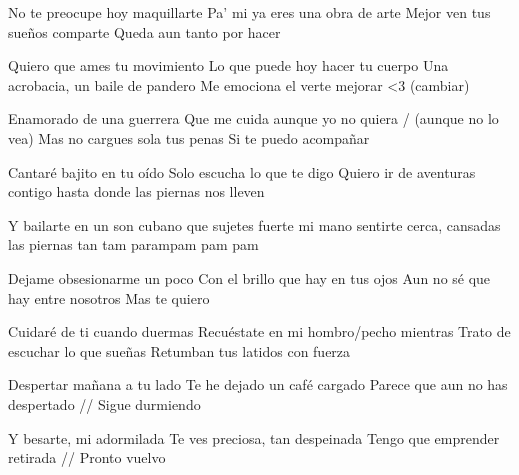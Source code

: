 
    No te preocupe hoy maquillarte
    Pa' mi ya eres una obra de arte
    Mejor ven tus sueños comparte
    Queda aun tanto por hacer
\endverse

\beginverse
    Quiero que ames tu movimiento
    Lo que puede hoy hacer tu cuerpo
    Una acrobacia, un baile de pandero
    Me emociona el verte mejorar <3 (cambiar)
\endverse

\beginverse
    Enamorado de una guerrera
    Que me cuida aunque yo no quiera / (aunque no lo vea)
    Mas no cargues sola tus penas
    Si te puedo acompañar
\endverse

\beginverse
    Cantaré bajito en tu oído
    Solo escucha lo que te digo
    Quiero ir de aventuras contigo
    hasta donde las piernas nos lleven
\endverse

\beginverse
    Y bailarte en un son cubano
    que sujetes fuerte mi mano
    sentirte cerca, cansadas las piernas
    tan tam parampam pam pam
\endverse

\beginverse
    Dejame obsesionarme un poco
    Con el brillo que hay en tus ojos
    Aun no sé que hay entre nosotros
    Mas te quiero
\endverse

\beginverse
    Cuidaré de ti cuando duermas
    Recuéstate en mi hombro/pecho mientras
    Trato de escuchar lo que sueñas
    Retumban tus latidos con fuerza
\endverse

\beginverse
    Despertar mañana a tu lado
    Te he dejado un café cargado
    Parece que aun no has despertado
    // Sigue durmiendo
\endverse

\beginverse
    Y besarte, mi adormilada
    Te ves preciosa, tan despeinada
    Tengo que emprender retirada
    // Pronto vuelvo
\endverse
